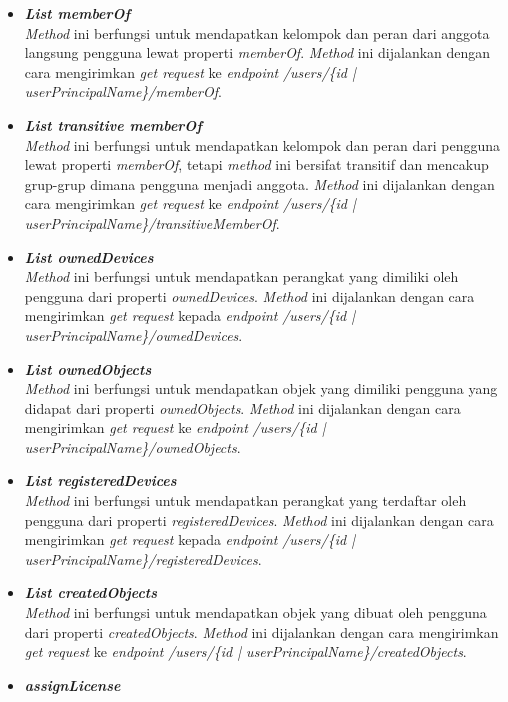 \begin{itemize}
	\item \textbf{\textit{List memberOf}}\\
	\textit{Method} ini berfungsi untuk mendapatkan kelompok dan peran dari anggota langsung pengguna lewat properti \textit{memberOf}. \textit{Method} ini dijalankan dengan cara mengirimkan \textit{get request} ke \textit{endpoint} \textit{/users/\{id | userPrincipalName\}/memberOf}.
	\item \textbf{\textit{List transitive memberOf}}\\
	\textit{Method} ini berfungsi untuk mendapatkan kelompok dan peran dari pengguna lewat properti \textit{memberOf}, tetapi \textit{method} ini bersifat transitif dan mencakup grup-grup dimana pengguna menjadi anggota. \textit{Method} ini dijalankan dengan cara mengirimkan \textit{get request} ke \textit{endpoint} \textit{/users/\{id | userPrincipalName\}/transitiveMemberOf}.
	\item \textbf{\textit{List ownedDevices}}\\
	\textit{Method} ini berfungsi untuk mendapatkan perangkat yang dimiliki oleh pengguna dari properti \textit{ownedDevices}. \textit{Method} ini dijalankan dengan cara mengirimkan \textit{get request} kepada \textit{endpoint} \textit{/users/\{id | userPrincipalName\}/ownedDevices}.
	\item \textbf{\textit{List ownedObjects}}\\
	\textit{Method} ini berfungsi untuk mendapatkan objek yang dimiliki pengguna yang didapat dari properti \textit{ownedObjects}. \textit{Method} ini dijalankan dengan cara mengirimkan \textit{get request} ke \textit{endpoint} \textit{/users/\{id | userPrincipalName\}/ownedObjects}.
	\item \textbf{\textit{List registeredDevices}}\\
	\textit{Method} ini berfungsi untuk mendapatkan perangkat yang terdaftar oleh pengguna dari properti \textit{registeredDevices}. \textit{Method} ini dijalankan dengan cara mengirimkan \textit{get request} kepada \textit{endpoint} \textit{/users/\{id | userPrincipalName\}/registeredDevices}.
	\item \textbf{\textit{List createdObjects}}\\
	\textit{Method} ini berfungsi untuk mendapatkan objek yang dibuat oleh pengguna dari properti \textit{createdObjects}. \textit{Method} ini dijalankan dengan cara mengirimkan \textit{get request} ke \textit{endpoint} \textit{/users/\{id | userPrincipalName\}/createdObjects}.
	\item \textbf{\textit{assignLicense}}\\

\end{itemize}
